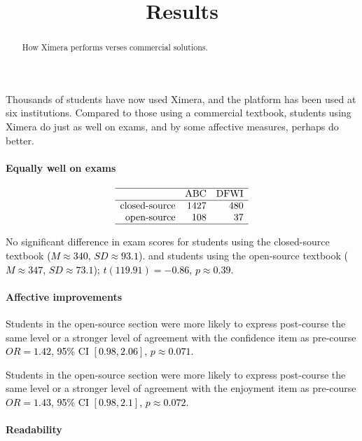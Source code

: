 \documentclass{ximera}
\title{Results}
\begin{document}
\begin{abstract}
  How Ximera performs verses commercial solutions.
\end{abstract}
\maketitle

Thousands of students have now used Ximera, and the platform has been
used at six institutions.  Compared to those using a commercial
textbook, students using Ximera do just as well on exams, and by some
affective measures, perhaps do better.


\paragraph{Equally well on exams}

\[
  \begin{array}{rrr}
    \hline
    & \text{ABC} & \text{DFWI} \\ 
    \hline
    \text{closed-source} & 1427 & 480 \\ 
    \text{open-source} & 108 &  37 \\ 
    \hline
  \end{array}
\]
    
No significant difference in exam scores for students using the
closed-source textbook \textcolor{black}{(\(M \approx 340\),
  \(SD \approx 93.1\))}.  and students using the open-source textbook
\textcolor{black}{(\(M \approx 347\), \(SD \approx 73.1\));}
\textcolor{black}{\(t( 119.91 ) = -0.86\), \(p\approx 0.39\).}

\paragraph{Affective improvements}

Students in the open-source section were more likely to express
post-course the same level or a stronger level of agreement with the
confidence item as pre-course \textcolor{black}{\(OR = 1.42\), 95\% CI
  \([ 0.98 , 2.06 ]\), \(p\approx 0.071\).}

Students in the open-source section were more likely to express
post-course the same level or a stronger level of agreement with the
enjoyment item as pre-course \textcolor{black}{\(OR = 1.43\), 95\% CI
  \([ 0.98 , 2.1 ]\), \(p\approx 0.072\).}

\paragraph{Readability}
\end{document}

